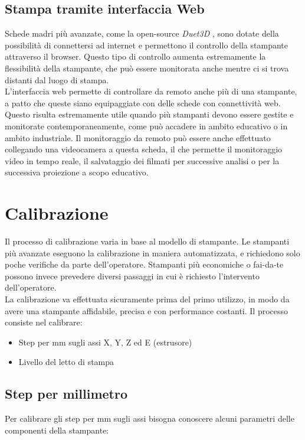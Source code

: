 \subsection{Stampa tramite interfaccia Web}
Schede madri più avanzate, come la open-source \emph{Duet3D} \parencite{Reference3}, sono dotate della possibilità di connettersi ad internet e permettono il controllo della stampante attraverso il browser. Questo tipo di controllo aumenta estremamente la flessibilità della stampante, che può essere monitorata anche mentre ci si trova distanti dal luogo di stampa.\\
L'interfaccia web permette di controllare da remoto anche più di una stampante, a patto che queste siano equipaggiate con delle schede con connettività web. Questo risulta estremamente utile quando più stampanti devono essere gestite e monitorate contemporaneamente, come può accadere in ambito educativo o in ambito industriale. Il monitoraggio da remoto può essere anche effettuato collegando una videocamera a questa scheda, il che permette il monitoraggio video in tempo reale, il salvataggio dei filmati per successive analisi o per la successiva proiezione a scopo educativo.

\section{Calibrazione}
Il processo di calibrazione varia in base al modello di stampante. Le stampanti più avanzate eseguono la calibrazione in maniera automatizzata, e richiedono solo poche verifiche da parte dell'operatore. Stampanti più economiche o fai-da-te possono invece prevedere diversi passaggi in cui è richiesto l'intervento dell'operatore.\\
La calibrazione va effettuata sicuramente prima del primo utilizzo, in modo da avere una stampante affidabile, precisa e con performance costanti. Il processo \parencite{Reference4} consiste nel calibrare:

\begin{itemize}
\item Step per mm sugli assi X, Y, Z ed E (estrusore)
\item Livello del letto di stampa
\end{itemize}

\subsection{Step per millimetro}
Per calibrare gli step per mm sugli assi bisogna conoscere alcuni parametri delle componenti della stampante:

